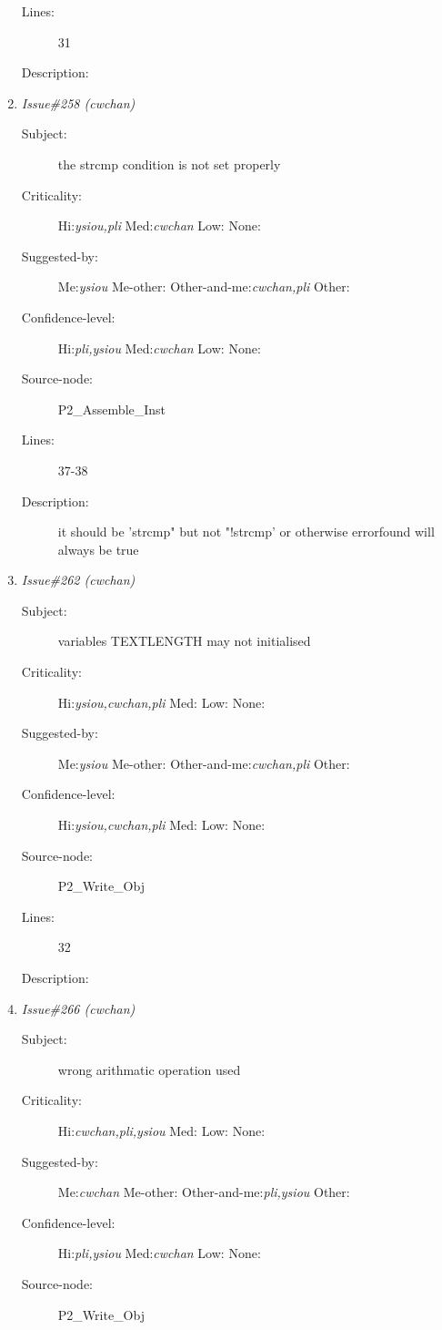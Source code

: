 \begin{enumerate}
\begin{description}
\item [Lines:] 31

\item [Description:] 
\end{description}
\item {\it Issue\#258 (cwchan)}
\begin{description}
\item [Subject:] the strcmp condition is not set properly
\item [Criticality:] Hi:{\it ysiou,pli} Med:{\it cwchan} Low:{\it } None:{\it }
\item [Suggested-by:] Me:{\it ysiou} Me-other:{\it } Other-and-me:{\it cwchan,pli} Other:{\it }
\item [Confidence-level:] Hi:{\it pli,ysiou} Med:{\it cwchan} Low:{\it } None:{\it }
\item [Source-node:] P2\_Assemble\_Inst

\item [Lines:] 37-38

\item [Description:] it should be 'strcmp" but not "!strcmp' or
otherwise errorfound will always be true
\end{description}
\item {\it Issue\#262 (cwchan)}
\begin{description}
\item [Subject:] variables TEXTLENGTH may not initialised
\item [Criticality:] Hi:{\it ysiou,cwchan,pli} Med:{\it } Low:{\it } None:{\it }
\item [Suggested-by:] Me:{\it ysiou} Me-other:{\it } Other-and-me:{\it cwchan,pli} Other:{\it }
\item [Confidence-level:] Hi:{\it ysiou,cwchan,pli} Med:{\it } Low:{\it } None:{\it }
\item [Source-node:] P2\_Write\_Obj

\item [Lines:] 32

\item [Description:] 
\end{description}
\item {\it Issue\#266 (cwchan)}
\begin{description}
\item [Subject:] wrong arithmatic operation used
\item [Criticality:] Hi:{\it cwchan,pli,ysiou} Med:{\it } Low:{\it } None:{\it }
\item [Suggested-by:] Me:{\it cwchan} Me-other:{\it } Other-and-me:{\it pli,ysiou} Other:{\it }
\item [Confidence-level:] Hi:{\it pli,ysiou} Med:{\it cwchan} Low:{\it } None:{\it }
\item [Source-node:] P2\_Write\_Obj


\end{description}
\end{enumerate}
